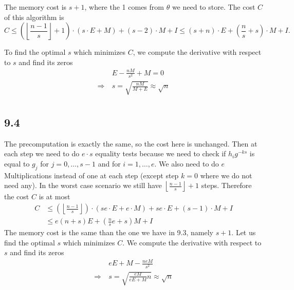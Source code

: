 \documentclass[12pt,a4paper]{article}
\newcommand {\thus}{\Rightarrow\:}
\begin{document}
The memory cost is $s + 1$, where the 1 comes from $\theta$ we need to store.
The cost $C$ of this algorithm is 
\[
    C \leq \left(\left\lfloor \frac{n-1}{s} \right\rfloor + 1\right)\cdot (s\cdot E + M) + (s-2)\cdot M + I \leq  (s + n)\cdot E + \left(\frac{n}{s} + s\right)\cdot M + I.
\]


To find the optimal $s$ which minimizes $C$, we compute the derivative with respect to $s$ and find its zeros
\[
    \begin{split}
              & E -\frac{nM}{s^2} + M = 0\\
        \thus & s = \sqrt{\frac{nM}{M+E}} \approx \sqrt{n}\\
    \end{split}
\]


\subsection{9.4}
The precomputation is exactly the same, so the cost here is unchanged. Then at each step we need to do $e\cdot s$ equality tests because we need to check
if $h_ig^{-ks}$ is equal to $g_j$ for $j=0,\dots,s-1$ and for $i=1,\dots,e$. We also need to do $e$ Multiplications instead of one at each step (except step $k=0$ where we do not need any).
In the worst case scenario we still have $\left\lfloor \frac{n-1}{s} \right\rfloor + 1$ steps. Therefore the cost $C$ is at most
\[
    \begin{split}
        C &\leq \left( \left\lfloor \frac{n-1}{s} \right\rfloor \right) \cdot (se \cdot E + e\cdot M) + se\cdot E + (s-1) \cdot M + I\\
          &\leq e(n+s)E + \left(\frac{n}{s}e + s\right)M + I
    \end{split}
\]
The memory cost is the same than the one we have in 9.3, namely $s+1$.
Let us find the optimal $s$ which minimizes $C$. We compute the derivative with respect to $s$ and find its zeros
\[
    \begin{split}
        & eE + M - \frac{neM}{s^2}\\
  \thus & s = \sqrt{\frac{eM}{eE + M}n} \approx \sqrt{n}
    \end{split}
\]
\end{document}
